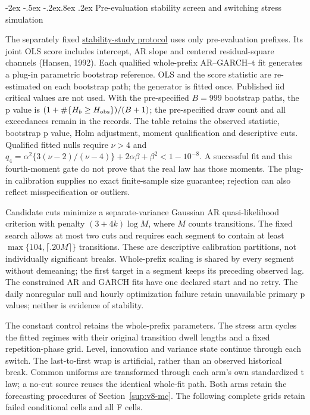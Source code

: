 \documentclass[10pt,a4paper]{article}
\makeatletter
\renewcommand\section{\@startsection{section}{1}{\z@}%
  {-2ex \@plus -.5ex \@minus -.2ex}{.8ex \@plus .2ex}%
  {\normalfont\large\bfseries}}
\makeatother
\begin{document}
\section{Pre-evaluation stability screen and switching stress simulation}\label{sup:v9-stability}

The separately fixed
\href{https://github.com/ByronLi0207/financial-mathematics-paper-20261020/blob/revision-v9/protocol/v9/nonstationarity-design.md}{stability-study protocol}
uses only pre-evaluation prefixes. Its joint OLS score includes intercept,
AR slope and centered residual-square channels (Hansen, 1992).
Each qualified whole-prefix AR--GARCH--t fit generates a plug-in parametric
bootstrap reference. OLS and the score statistic are re-estimated on each
bootstrap path; the generator is fitted once. Published iid critical values
are not used. With the pre-specified \(B=999\) bootstrap paths, the p value is
\((1+\#\{H_b\ge H_{\rm obs}\})/(B+1)\); the pre-specified draw count and
all exceedances remain in the records. The table retains the observed statistic,
bootstrap p value, Holm adjustment, moment qualification and descriptive cuts.
Qualified fitted nulls require \(\nu>4\) and
\(q_4=\alpha^2\{3(\nu-2)/(\nu-4)\}+2\alpha\beta+\beta^2<1-10^{-8}\).
A successful fit and this fourth-moment gate do not prove that the real law
has those moments. The plug-in calibration supplies no exact finite-sample
size guarantee; rejection can also reflect misspecification or outliers.



Candidate cuts minimize a separate-variance Gaussian AR quasi-likelihood
criterion with penalty \((3+4k)\log M\), where \(M\) counts transitions.
The fixed search allows at most two cuts and requires each segment to contain
at least \(\max\{104,\lceil .20M\rceil\}\) transitions.
These are descriptive calibration partitions, not individually significant
breaks. Whole-prefix scaling is shared by every segment without demeaning;
the first target in a segment keeps its preceding observed lag.
The constrained AR and GARCH fits have one declared start and no retry.
The daily nonregular null and hourly optimization failure retain unavailable
primary p values; neither is evidence of stability.

The constant control retains the whole-prefix parameters. The stress arm
cycles the fitted regimes with their original transition dwell lengths and a
fixed repetition-phase grid. Level, innovation and variance state continue
through each switch. The last-to-first wrap is artificial, rather than an
observed historical break. Common uniforms are transformed through each arm's
own standardized t law; a no-cut source reuses the identical whole-fit path.
Both arms retain the forecasting procedures of Section~\ref{sup:v8-mc}.
The following complete grids retain failed conditional cells and all F cells.
\end{document}
